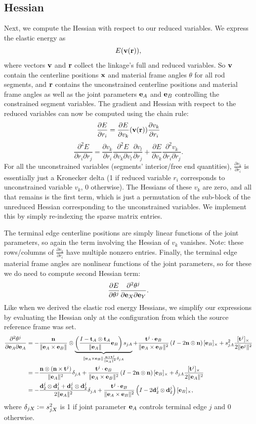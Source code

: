 \documentclass[10pt]{article}
\newcommand{\defeq}{\vcentcolon=}
\providecommand{\norm}[1]{\lVert#1\rVert}
\providecommand{\cross}{\times}
\providecommand{\pder}[2]{\frac{\partial #1}{\partial #2}}
\providecommand{\spder}[3]{\frac{\partial^2 #1}{\partial #2 \partial #3}}
\renewcommand{\vec}[1]{{\bf #1}}
\def\normal{{\bf n}}
\def\n{\normal}
\def\d{\vec{d}}
\def\t{\vec{t}}
\def\x{\vec{x}}
\def\r{\vec{r}}
\def\v{\vec{v}}
\def\e{\vec{e}}
\begin{document}
\subsection{Hessian}

Next, we compute the Hessian with respect to our reduced variables. We express the elastic energy as
$$
E(\v(\r)),
$$
where vectors $\v$ and $\r$ collect the linkage's full and reduced variables.
So $\v$ contain the centerline positions $\x$ and material frame angles
$\theta$ for all rod segments, and $\r$ contains the unconstrained centerline
positions and material frame angles as well as the joint parameters $\e_A$ and
$\e_B$ controlling the constrained segment variables.
The gradient and Hessian with respect to the reduced variables can now be computed using the chain rule:
$$
\pder{E}{r_i} = \pder{E}{v_k}(\v(\r)) \pder{v_k}{r_i}
$$
$$
\spder{E}{r_i}{r_j} =
\pder{v_k}{r_i} \spder{E}{v_k}{v_l} \pder{v_l}{r_j}
+
\pder{E}{v_k} \spder{v_k}{r_i}{r_j}.
$$
For all the unconstrained variables (segments' interior/free end quantities),
$\pder{v_k}{r_i}$ is essentially just a Kronecker delta (1 if reduced variable
$r_i$ corresponds to unconstrained variable $v_k$, 0 otherwise). The Hessians
of these $v_k$ are zero, and all that remains is the first term, which is just
a permutation of the sub-block of the unreduced Hessian corresponding to the
unconstrained variables. We implement this by simply re-indexing the sparse
matrix entries.

The terminal edge centerline positions are simply linear functions of the
joint parameters, so again the term involving the Hessian of $v_k$ vanishes.
Note: these rows/columns of $\pder{v_k}{r_i}$ have multiple nonzero entries.
Finally, the terminal edge material frame angles are nonlinear functions of the
joint parameters, so for these we do need to compute second Hessian term:
$$
\pder{E}{\theta^j} \spder{\theta^j}{\e_X}{\e_Y}.
$$
Like when we derived the elastic rod energy Hessians, we simplify our
expressions by evaluating the Hessian only at the configuration from which the
source reference frame was set.
\begin{align*}
\spder{\theta^j}{\e_A}{\e_A} &=
        -\frac{\n}{\norm{\e_A \cross \e_B}} \otimes 
            \underbrace{\left(\frac{I - \t_A \otimes \t_A}{\norm{\e_A}} \e_B \right)s_{jA}}_{\norm{\e_A \cross \e_B} \frac{\n \cross \t^j}{\norm{\e_A}^2} \delta_{jA}}
        +\frac{\t^j \cdot \e_B}{\norm{\e_A \cross \e_B}^2}\left(I - 2 \n \otimes \n \right) [\e_B]_\cross
        + s_{jA}^2 \frac{[\t^j]_\cross}{2 \norm{\e^j}^2}
    \\
    &=
        -\frac{\n \otimes (\n \cross \t^j)}{\norm{\e_A}^2} \delta_{jA}
        +\frac{\t^j \cdot \e_B}{\norm{\e_A \cross \e_B}^2}\left(I - 2 \n \otimes \n \right) [\e_B]_\cross
        + \delta_{jA} \frac{[\t^j]_\cross}{2 \norm{\e_A}^2}
    \\
    &=
        -\frac{\d_2^j \otimes \d_1^j + \d_1^j \otimes \d_2^j}{2 \norm{\e_A}^2} \delta_{jA}
        +\frac{\t^j \cdot \e_B}{\norm{\e_A \cross \e_B}^2}\left(I - 2 \d_2^j \otimes \d_2^j \right) [\e_B]_\cross,
\end{align*}
where $\delta_{jX} \defeq s_{jX}^2$ is 1 if joint parameter $\e_A$ controls terminal edge $j$ and 0 otherwise.
\end{document}
